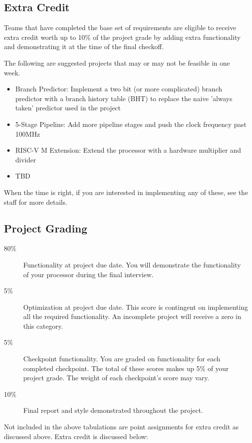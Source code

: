 \documentclass[11pt]{article}
\begin{document}
\subsection{Extra Credit}
\label{extra_credit}
Teams that have completed the base set of requirements are eligible to receive extra credit worth up to 10\% of the project grade by adding extra functionality and demonstrating it at the time of the final checkoff.

The following are suggested projects that may or may not be feasible in one week.
\begin{itemize}
  \item Branch Predictor: Implement a two bit (or more complicated) branch predictor with a branch history table (BHT) to replace the naive 'always taken' predictor used in the project
  \item 5-Stage Pipeline: Add more pipeline stages and push the clock frequency past 100MHz
  \item RISC-V M Extension: Extend the processor with a hardware multiplier and divider
  \item TBD
\end{itemize}

When the time is right, if you are interested in implementing any of these, see the staff for more details.

\subsection{Project Grading}
\label{deadlinegrading}

\begin{description}
  \item[80\%] {Functionality} at project due date. You will demonstrate the functionality of your processor during the final interview.
  \item[5\%] {Optimization} at project due date. This score is contingent on implementing all the required functionality. An incomplete project will receive a zero in this category.
  \item[5\%] {Checkpoint} functionality. You are graded on functionality for each completed checkpoint. The total of these scores makes up 5\% of your project grade. The weight of each checkpoint's score may vary.
  \item[10\%] {Final report} and {style} demonstrated throughout the project.
\end{description}

Not included in the above tabulations are point assignments for extra credit as discussed above. Extra credit is discussed below:
\end{document}
